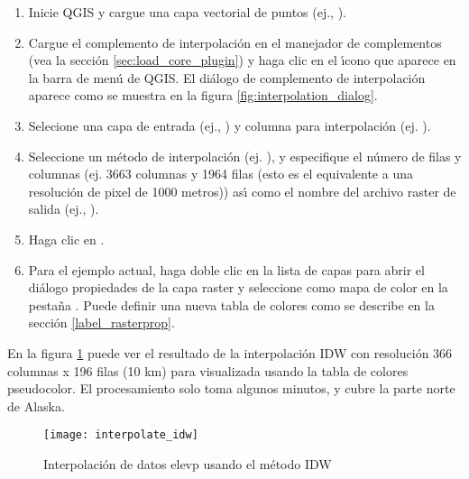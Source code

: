 \begin{enumerate}
  \item Inicie QGIS y cargue una capa vectorial de puntos (ej., ). 
  \item Cargue el complemento de interpolaci\'on en el manejador de complementos (vea la secci\'on 
  \ref{sec:load_core_plugin}) y haga clic en el \'{\i}cono  
  que aparece en la barra de men\'u de QGIS. El di\'alogo de complemento de interpolaci\'on aparece como 
  se muestra en la figura \ref{fig:interpolation_dialog}.
  \item Selecione una capa de entrada (ej., ) y columna para interpolaci\'on (ej. ).
  \item Seleccione un m\'etodo de interpolaci\'on (ej. ), y especifique 
  el n\'umero de filas y columnas (ej. 3663 columnas y 1964 filas (esto es el equivalente a una resoluci\'on de pixel de 1000 metros))
  as\'{\i} como el nombre del archivo raster de salida (ej., ).
  \item Haga clic en .
  \item Para el ejemplo actual, haga doble clic  en la lista de capas para abrir el di\'alogo propiedades de la capa raster 
  y seleccione  como mapa de color en la pesta\~na . Puede  
  definir una nueva tabla de colores como se describe en la secci\'on \ref{label_rasterprop}.
\end{enumerate}

En la figura \ref{fig:interpolation_idw} puede ver el resultado de la interpolaci\'on IDW con resoluci\'on 366 columnas x 196 filas (10 km) 
para  visualizada usando la tabla de colores pseudocolor. El procesamiento 
solo toma algunos minutos, y cubre la parte norte de Alaska.

\begin{figure}[ht]
   \begin{center}
   \caption{Interpolaci\'on de datos elevp usando el m\'etodo IDW \nixcaption}\label{fig:interpolation_idw}\smallskip
   \texttt{[image: interpolate\_idw]}
\end{center}  
\end{figure}

\newpage




